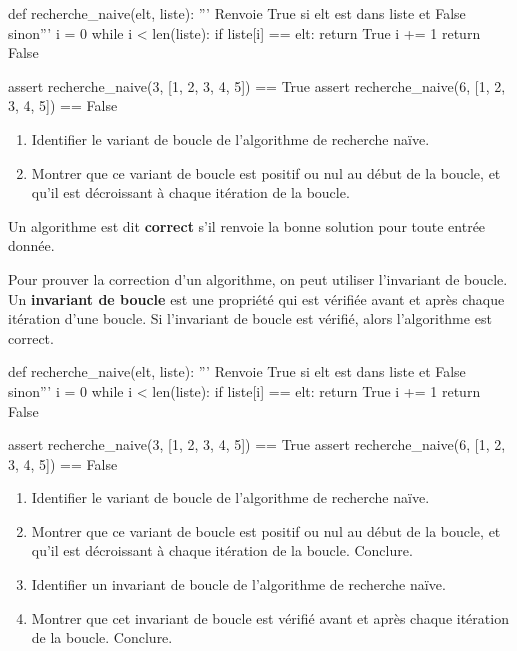 \begin{exercice_cours}{}
	\begin{CodePythontexAlt}[Largeur=1\linewidth,Centre,PremLigne=1]{}
		def recherche_naive(elt, liste):
			''' Renvoie True si elt est dans liste et False sinon'''
			i = 0
			while i < len(liste):
				if liste[i] == elt:
					return True
				i += 1
			return False
			
		assert recherche_naive(3, [1, 2, 3, 4, 5]) == True
		assert recherche_naive(6, [1, 2, 3, 4, 5]) == False
		\end{CodePythontexAlt}
		\begin{enumerate}
			\item Identifier le variant de boucle de l'algorithme de recherche naïve.
			\item Montrer que ce variant de boucle est positif ou nul au début de la boucle, et qu'il est décroissant à chaque itération de la boucle.
		\end{enumerate}
\end{exercice_cours}


		\begin{definition}{}
	Un algorithme est dit \textbf{correct} s'il renvoie la bonne solution pour toute entrée donnée. 

	Pour prouver la correction d'un algorithme, on peut utiliser l'invariant de boucle. Un \textbf{invariant de boucle} est une propriété qui est vérifiée avant et après chaque itération d'une boucle. Si l'invariant de boucle est vérifié, alors l'algorithme est correct.
\end{definition}

\begin{exercice_cours}{}
	\begin{CodePythontexAlt}[Largeur=1\linewidth,Centre,PremLigne=1]{}
		def recherche_naive(elt, liste):
			''' Renvoie True si elt est dans liste et False sinon'''
			i = 0
			while i < len(liste):
				if liste[i] == elt:
					return True
				i += 1
			return False
			
		assert recherche_naive(3, [1, 2, 3, 4, 5]) == True
		assert recherche_naive(6, [1, 2, 3, 4, 5]) == False
		\end{CodePythontexAlt}
		\begin{enumerate}
			\item Identifier le variant de boucle de l'algorithme de recherche naïve.
			\item Montrer que ce variant de boucle est positif ou nul au début de la boucle, et qu'il est décroissant à chaque itération de la boucle. Conclure.			\item Identifier un invariant de boucle de l'algorithme de recherche naïve.
			\item Montrer que cet invariant de boucle est vérifié avant et après chaque itération de la boucle. Conclure.
		\end{enumerate}
\end{exercice_cours}

